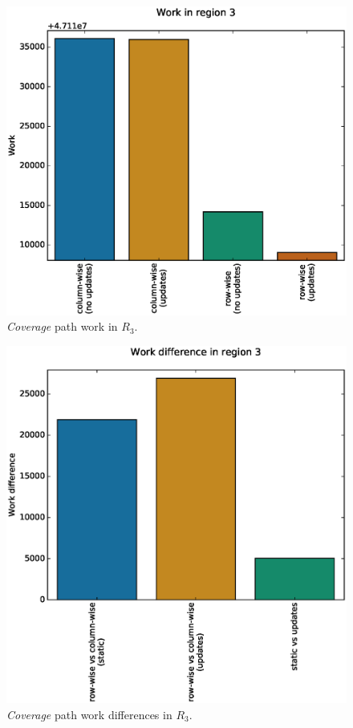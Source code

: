 \documentclass{tamuccthesis}
\begin{document}
\begin{figure}[H]
    \captionsetup{justification=centering}
    \centering
    \includegraphics[width=\textwidth,trim={0cm 0cm 0cm 0.75cm},clip]{work_r3.eps}
    \caption{\textit{Coverage} path work in $R_3$.}
    \label{fig:coverage_noterrain_work_r3}
\end{figure}
\begin{figure}[H]
    \captionsetup{justification=centering}
    \centering
    \includegraphics[width=\textwidth,trim={0cm 0cm 0cm 0.75cm},clip]{diff_r3.eps}
    \caption{\textit{Coverage} path work differences in $R_3$.}
    \label{fig:coverage_noterrain_diff_r3}
\end{figure}
\end{document}

